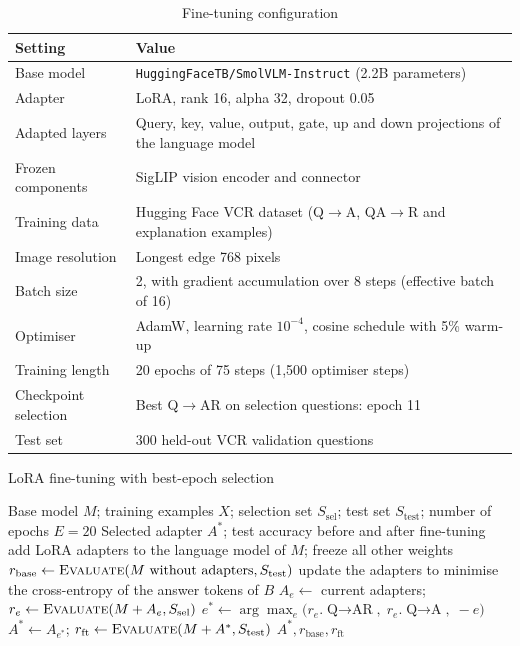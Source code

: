 \documentclass[12pt,a4paper,oneside]{report}
\newcommand{\QtoA}{Q$\rightarrow$A}
\newcommand{\QAtoR}{QA$\rightarrow$R}
\newcommand{\QtoAR}{Q$\rightarrow$AR}
\newcommand{\code}[1]{\texttt{#1}}
\begin{document}
\begin{table}[htbp]
\centering
\caption{Fine-tuning configuration}
\label{tab:ftconfig}
\small
\begin{tabularx}{\textwidth}{@{}p{4cm}L@{}}
\toprule
\textbf{Setting} & \textbf{Value}\\
\midrule
Base model & \code{HuggingFaceTB/SmolVLM-Instruct} (2.2B parameters)\\
Adapter & LoRA, rank 16, alpha 32, dropout 0.05\\
Adapted layers & Query, key, value, output, gate, up and down projections of the language model\\
Frozen components & SigLIP vision encoder and connector\\
Training data & Hugging Face VCR dataset (\QtoA, \QAtoR{} and explanation examples)\\
Image resolution & Longest edge 768 pixels\\
Batch size & 2, with gradient accumulation over 8 steps (effective batch of 16)\\
Optimiser & AdamW, learning rate $10^{-4}$, cosine schedule with 5\% warm-up\\
Training length & 20 epochs of 75 steps (1,500 optimiser steps)\\
Checkpoint selection & Best \QtoAR{} on selection questions: epoch 11\\
Test set & 300 held-out VCR validation questions\\
\bottomrule
\end{tabularx}
\end{table}

\begin{algorithm}[htbp]
\caption{LoRA fine-tuning with best-epoch selection}
\label{alg:lora}
\begin{algorithmic}[1]
\Require Base model $M$; training examples $X$; selection set $S_{\text{sel}}$; test set $S_{\text{test}}$; number of epochs $E = 20$
\Ensure Selected adapter $A^*$; test accuracy before and after fine-tuning
\State add LoRA adapters to the language model of $M$; freeze all other weights
\State $r_{\text{base}} \gets \textsc{Evaluate}(M \text{ without adapters}, S_{\text{test}})$
    \State update the adapters to minimise the cross-entropy of the answer tokens of $B$
  \EndFor
  \State $A_e \gets$ current adapters;\; $r_e \gets \textsc{Evaluate}(M + A_e, S_{\text{sel}})$
\EndFor
\State $e^* \gets \arg\max_e \big(r_e.\text{\QtoAR},\; r_e.\text{\QtoA},\; -e\big)$ \Comment{ties: higher \QtoA, then earlier epoch}
\State $A^* \gets A_{e^*}$;\; $r_{\text{ft}} \gets \textsc{Evaluate}(M + A^*, S_{\text{test}})$
\State \Return $A^*, r_{\text{base}}, r_{\text{ft}}$
\end{algorithmic}
\end{algorithm}
\end{document}
